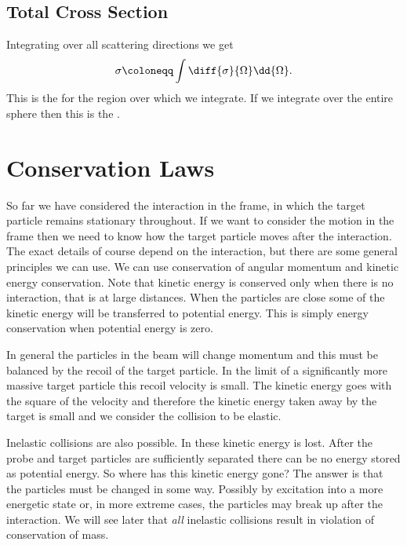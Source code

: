     \subsection{Total Cross Section}
    Integrating over all scattering directions we get
    \begin{equation}
        \sigma \coloneqq \int \diff{\sigma}{\Omega}\dd{\Omega}.
    \end{equation}
    This is the  for the region over which we integrate.
    If we integrate over the entire sphere then this is the .
    
    \section{Conservation Laws}
    So far we have considered the interaction in the \LAB{} frame, in which the target particle remains stationary throughout.
    If we want to consider the motion in the \CM{} frame then we need to know how the target particle moves after the interaction.
    The exact details of course depend on the interaction, but there are some general principles we can use.
    We can use conservation of angular momentum and kinetic energy conservation.
    Note that kinetic energy is conserved only when there is no interaction, that is at large distances.
    When the particles are close some of the kinetic energy will be transferred to potential energy.
    This is simply energy conservation when potential energy is zero.
    
    In general the particles in the beam will change momentum and this must be balanced by the recoil of the target particle.
    In the limit of a significantly more massive target particle this recoil velocity is small.
    The kinetic energy goes with the square of the velocity and therefore the kinetic energy taken away by the target is small and we consider the collision to be elastic.
    
    Inelastic collisions are also possible.
    In these kinetic energy is lost.
    After the probe and target particles are sufficiently separated there can be no energy stored as potential energy.
    So where has this kinetic energy gone?
    The answer is that the particles must be changed in some way.
    Possibly by excitation into a more energetic state or, in more extreme cases, the particles may break up after the interaction.
    We will see later that \emph{all} inelastic collisions result in violation of conservation of mass.
    
